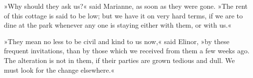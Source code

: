 »Why should they ask us?« said Marianne, as soon as they were gone. »The rent of this cottage is said to be low; but we have it on very hard terms, if we are to dine at the park whenever any one is staying either with them, or with us.«

»They mean no less to be civil and kind to us now,« said Elinor, »by these frequent invitations, than by those which we received from them a few weeks ago. The alteration is not in them, if their parties are grown tedious and dull. We must look for the change elsewhere.«